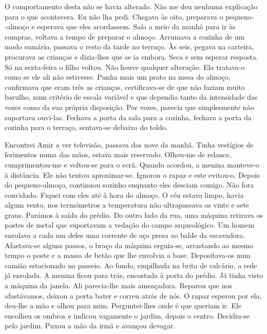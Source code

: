 O comportamento desta não se havia alterado. Não me deu nenhuma
explicação para o que acontecera. Eu não lha pedi. Chegava às oito,
preparava o pequeno­‑almoço e esperava que eles acordassem. Saía a meio
da manhã para ir às compras, voltava a tempo de preparar o almoço.
Arrumava a cozinha de um modo sumário, passava o resto da tarde no
terraço. Às seis, pegava na carteira, procurava as crianças e
dizia­‑lhes que se ia embora. Seca e sem esperar resposta. Só na
sexta­‑feira o filho voltou. Não houve qualquer alteração. Ela
tratava­‑o como se ele ali não estivesse. Punha mais um prato na mesa do
almoço, confirmava que eram três as crianças, certificava­‑se de que não
faziam muito barulho, num critério de escala variável e que dependia
tanto da intensidade das vozes como da sua própria disposição. Por
vezes, parecia que simplesmente não suportava ouvi­‑las. Fechava a porta
da sala para a cozinha, fechava a porta da cozinha para o terraço,
sentava­‑se debaixo do toldo.

Encontrei Amir a ver televisão, passava das nove da manhã. Tinha
vestígios de ferimentos numa das mãos, estava mais reservado. Olhou­‑me
de relance, cumprimentou­‑me e voltou­‑se para o ecrã. Quando acordou, a
menina manteve­‑o à distância. Ele não tentou aproximar­‑se. Ignorou o
rapaz e este evitou­‑o. Depois do pequeno­‑almoço, continuou sozinho
enquanto eles desciam comigo. Não fora convidado. Fiquei com eles até à
hora do almoço. O céu estava limpo, havia algum vento, nos termómetros a
temperatura não ultrapassava os vinte e sete graus. Parámos à saída do
prédio. Do outro lado da rua, uma máquina retirava os postes de metal
que suportavam a vedação do campo arqueológico. Um homem enrolava a cada
um deles uma corrente de aço presa ao balde da escavadora. Afastava­‑se
alguns passos, o braço da máquina erguia­‑se, arrastando ao mesmo tempo
o poste e a massa de betão que lhe envolvia a base. Depositava­‑os num
camião estacionado no passeio. Ao fundo, empilhada na brita de calcário,
a rede já enrolada. A menina ficou para trás, encostada à porta do
prédio. Já tinha visto a máquina da janela. Ali parecia­‑lhe mais
ameaçadora. Reparou que nos afastávamos, deixou a porta bater e correu
atrás de nós. O rapaz esperou por ela, deu­‑lhe a mão e olhou para mim.
Perguntei­‑lhes onde é que queriam ir. Ele encolheu os ombros e indicou
vagamente o jardim, depois o centro. Decidiu­‑se pelo jardim. Puxou a
mão da irmã e avançou devagar.

